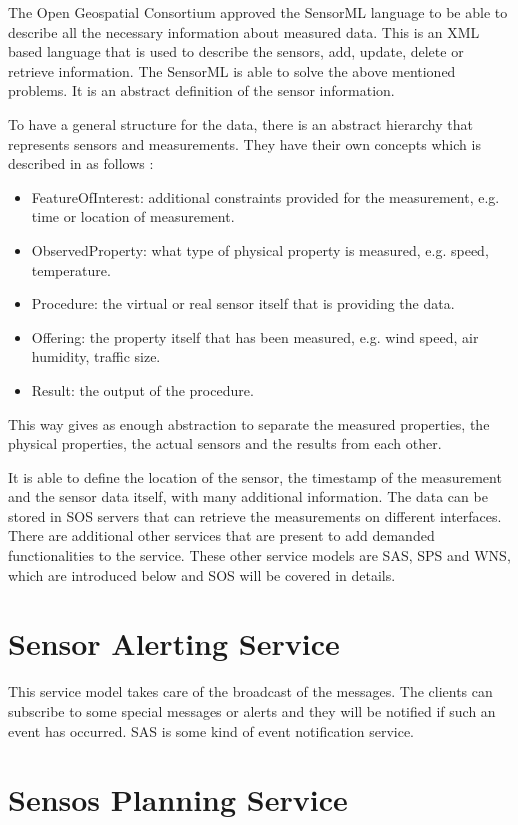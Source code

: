 The Open Geospatial Consortium approved the SensorML language to be able to describe all the necessary information about measured data\cite{sensorml}. This is an XML based language that is used to describe the sensors, add, update, delete or retrieve information. The SensorML is able to solve the above mentioned problems. It is an abstract definition of the sensor information.

To have a general structure for the data, there is an abstract hierarchy that represents sensors and measurements. They have their own concepts which is described in as follows \cite{g2d2}:
\begin{itemize}
\item FeatureOfInterest: additional constraints provided for the measurement, e.g. time or location of measurement.
\item ObservedProperty: what type of physical property is measured, e.g. speed, temperature.
\item Procedure: the virtual or real sensor itself that is providing the data.
\item Offering: the property itself that has been measured, e.g. wind speed, air humidity, traffic size. 
\item Result: the output of the procedure.
\end{itemize}

This way gives as enough abstraction to separate the measured properties, the physical properties, the actual sensors and the results from each other.

It is able to define the location of the sensor, the timestamp of the measurement and the sensor data itself, with many additional information. The data can be stored in SOS servers that can retrieve the measurements on different interfaces. There are additional other services\cite{g4d3} that are present to add demanded functionalities to the service. These other service models are SAS, SPS and WNS, which are introduced below and SOS will be covered in details.

\section{Sensor Alerting Service}
This service model takes care of the broadcast of the messages. The clients can subscribe to some special messages or alerts and they will be notified if such an event has occurred. SAS is some kind of event notification service.

\section{Sensos Planning Service}
 
